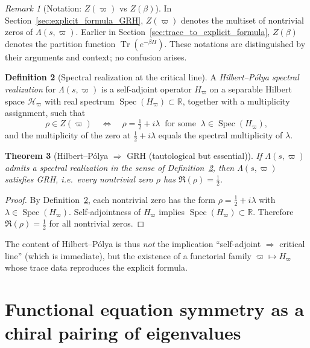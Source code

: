 \documentclass[11pt,oneside]{amsbook}
\numberwithin{equation}{section}
\theoremstyle{plain}
\newtheorem{theorem}{Theorem}[section]
\theoremstyle{definition}
\newtheorem{definition}[theorem]{Definition}
\theoremstyle{remark}
\newtheorem{remark}[theorem]{Remark}
\DeclareMathOperator{\Spec}{\mathrm{Spec}}
\DeclareMathOperator{\Tr}{\mathrm{Tr}}
\begin{document}
\begin{remark}[Notation: $Z(\varpi)$ vs $Z(\beta)$]
In Section~\ref{sec:explicit_formula_GRH}, $Z(\varpi)$ denotes the multiset of nontrivial zeros of $\Lambda(s,\varpi)$.  Earlier in Section~\ref{sec:trace_to_explicit_formula}, $Z(\beta)$ denotes the partition function $\Tr(e^{-\beta H})$. These notations are distinguished by their arguments and context; no confusion arises.
\end{remark}

\begin{definition}[Spectral realization at the critical line]
\label{def:spectral_realization}
A \emph{Hilbert--Pólya spectral realization} for $\Lambda(s,\varpi)$ is a self-adjoint operator $H_\varpi$ on a separable Hilbert space $\mathcal{H}_\varpi$ with real spectrum $\Spec(H_\varpi)\subset\mathbb{R}$, together with a multiplicity assignment, such that
\[
\rho\in Z(\varpi)
\quad\Longleftrightarrow\quad
\rho=\tfrac12+i\lambda\ \text{ for some }\ \lambda\in\Spec(H_\varpi),
\]
and the multiplicity of the zero at $\tfrac12+i\lambda$ equals the spectral multiplicity of $\lambda$.
\end{definition}

\begin{theorem}[Hilbert--Pólya $\Rightarrow$ GRH (tautological but essential)]
\label{thm:hp_implies_grh}
If $\Lambda(s,\varpi)$ admits a spectral realization in the sense of Definition~\ref{def:spectral_realization}, then $\Lambda(s,\varpi)$ satisfies GRH, i.e.\ every nontrivial zero $\rho$ has $\Re(\rho)=\tfrac12$.
\end{theorem}

\begin{proof}
By Definition~\ref{def:spectral_realization}, each nontrivial zero has the form $\rho=\tfrac12+i\lambda$ with $\lambda\in\Spec(H_\varpi)$.
Self-adjointness of $H_\varpi$ implies $\Spec(H_\varpi)\subset\mathbb{R}$.
Therefore $\Re(\rho)=\tfrac12$ for all nontrivial zeros.
\end{proof}

The content of Hilbert--Pólya is thus \emph{not} the implication ``self-adjoint $\Rightarrow$ critical line'' (which is immediate), but the existence of a functorial family $\varpi\mapsto H_\varpi$ whose trace data reproduces the explicit formula.

\section{Functional equation symmetry as a chiral pairing of eigenvalues}
\label{sec:functional_equation_chiral}
\end{document}

